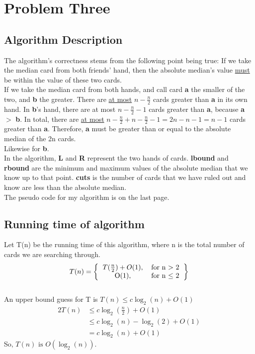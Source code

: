 \documentclass[a4paper,12pt]{article}
\begin{document}
\section{Problem Three}
\subsection*{Algorithm Description}
The algorithm's correctness stems from the following point being true: If we take the median card from both friends'
hand, then the absolute median's value \underline{must} be within the value of these two cards.\\

\noindent If we take the median card from both hands, and call card {\bf a} the smaller of the two, and {\bf b} the 
greater. There are \underline{at most} \(n - \frac{n}{2}\) cards greater than {\bf a} in its own hand. In {\bf b}'s 
hand, there are at most \(n - \frac{n}{2} - 1\) cards greater than {\bf a}, because {\bf a} \(>\) {\bf b}. In total,
there are \underline{at most} \( n - \frac{n}{2} + n - \frac{n}{2} - 1 = 2n - n - 1 = n - 1\) cards greater
than {\bf a}. Therefore, {\bf a} must be greater than or equal to the absolute median of the 2n cards.\\

\noindent Likewise for {\bf b}.\\

\noindent In the algorithm, {\bf L} and {\bf R} represent the two hands of cards. {\bf lbound} and {\bf rbound}
are the minimum and maximum values of the absolute median that we know up to that point. {\bf cuts} is the number of cards that we have ruled out and know are less than the absolute median.\\

\noindent The pseudo code for my algorithm is on the last page.

\subsection*{Running time of algorithm}
Let T(n) be the running time of this algorithm, where n is the total number of cards we are searching through.\\

\[T(n) = \left\{
\begin{tabular}{c c}
    \(T(\frac{n}{2}) + O(1)\),& for n \(>\) 2 \\
    O(1),& for n \(\le\) 2\\
\end{tabular}
\right\}\]\\

An upper bound guess for T is \(T(n) \le c\log_2 (n) + O(1) \)
\begin{alignat*}{2}
  T(n)& \le c\log_2 (\frac{n}{2}) + O(1) \\
  {}& \le c\log_2 (n) - \log_2 (2) + O(1)\\
  {}& = c\log_2(n) + O(1)
\end{alignat*}
So, \(T(n) \text{ is } O(\log_2 (n))\).
\end{document}
